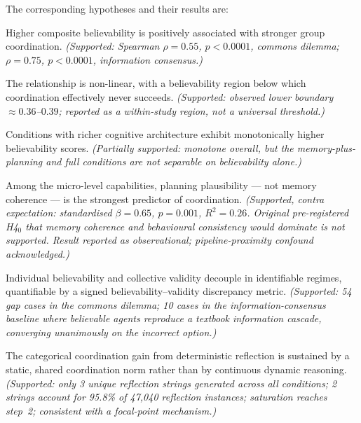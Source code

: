 \documentclass[11pt]{article}
\begin{document}
\bigskip
\noindent The corresponding hypotheses and their results are:

\begin{description}[leftmargin=1.4cm, style=nextline]
    \item[H1] Higher composite believability is positively associated with stronger group coordination. \emph{(Supported: Spearman $\rho = 0.55$, $p < 0.0001$, commons dilemma; $\rho = 0.75$, $p < 0.0001$, information consensus.)}

    \item[H2] The relationship is non-linear, with a believability region below which coordination effectively never succeeds. \emph{(Supported: observed lower boundary $\approx 0.36$--$0.39$; reported as a within-study region, not a universal threshold.)}

    \item[H3] Conditions with richer cognitive architecture exhibit monotonically higher believability scores. \emph{(Partially supported: monotone overall, but the memory-plus-planning and full conditions are not separable on believability alone.)}

    \item[H4] Among the micro-level capabilities, planning plausibility --- not memory coherence --- is the strongest predictor of coordination. \emph{(Supported, contra expectation: standardised $\beta = 0.65$, $p = 0.001$, $R^2 = 0.26$. Original pre-registered H4$_0$ that memory coherence and behavioural consistency would dominate is not supported. Result reported as observational; pipeline-proximity confound acknowledged.)}

    \item[H5] Individual believability and collective validity decouple in identifiable regimes, quantifiable by a signed believability--validity discrepancy metric. \emph{(Supported: 54 gap cases in the commons dilemma; 10 cases in the information-consensus baseline where believable agents reproduce a textbook information cascade, converging unanimously on the incorrect option.)}

    \item[H6] The categorical coordination gain from deterministic reflection is sustained by a static, shared coordination norm rather than by continuous dynamic reasoning. \emph{(Supported: only 3 unique reflection strings generated across all conditions; 2 strings account for 95.8\% of 47,040 reflection instances; saturation reaches step~2; consistent with a focal-point mechanism.)}


\end{description}
\end{document}
